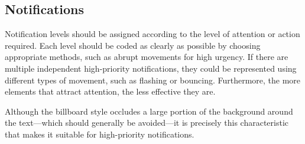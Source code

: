 \subsection{Notifications}

Notification levels should be assigned according to the level of attention or action required. Each level should be coded as clearly as possible by choosing appropriate methods, such as abrupt movements for high urgency. If there are multiple independent high-priority notifications, they could be represented using different types of movement, such as flashing or bouncing. Furthermore, the more elements that attract attention, the less effective they are.

Although the billboard style occludes a large portion of the background around the text—which should generally be avoided—it is precisely this characteristic that makes it suitable for high-priority notifications.